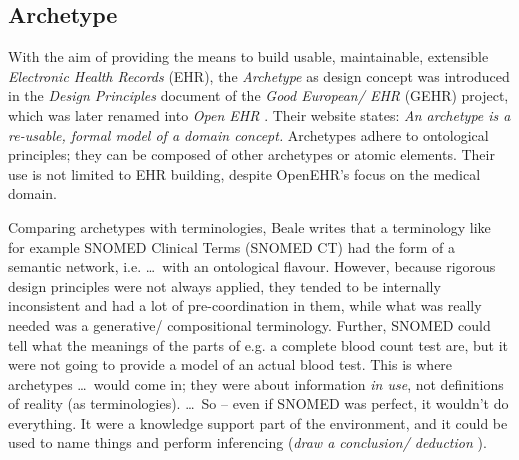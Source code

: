 %
%
%
%
%
%
%

\subsection{Archetype}
\label{archetype_heading}

With the aim of providing the means to build usable, maintainable, extensible
\emph{Electronic Health Records} (EHR), the \emph{Archetype} as design concept
was introduced in the \emph{Design Principles} document of the
\emph{Good European/ EHR} (GEHR) project, which was later renamed into
\emph{Open EHR} \cite{openehr}. Their website states: \textit{An archetype is a
re-usable, formal model of a domain concept.} Archetypes adhere to ontological
principles; they can be composed of other archetypes or atomic elements. Their
use is not limited to EHR building, despite OpenEHR's focus on the medical
domain.

Comparing archetypes with terminologies, Beale \cite{openehrtechnical} writes
that a terminology like for example SNOMED Clinical Terms (SNOMED CT) had the
form of a semantic network, i.e. \ldots\ with an ontological flavour. However,
because rigorous design principles were not always applied, they tended to be
internally inconsistent and had a lot of pre-coordination in them, while what
was really needed was a generative/ compositional terminology. Further, SNOMED
could tell what the meanings of the parts of e.g. a complete blood count test
are, but it were not going to provide a model of an actual blood test. This is
where archetypes \ldots\ would come in; they were about information
\emph{in use}, not definitions of reality (as terminologies). \ldots\ So --
even if SNOMED was perfect, it wouldn't do everything. It were a knowledge
support part of the environment, and it could be used to name things and
perform inferencing (\textit{draw a conclusion/ deduction} \cite{websters}).

